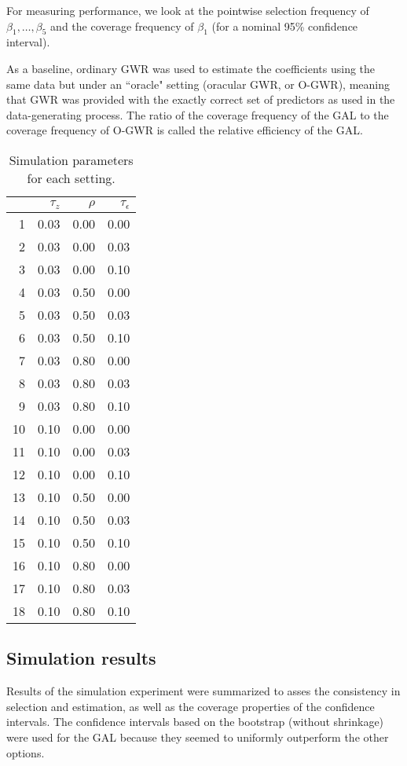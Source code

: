 \documentclass[authoryear, review, 11pt]{elsarticle}
\begin{document}
	For measuring performance, we look at the pointwise selection frequency of $\beta_1, \dots, \beta_5$ and the coverage frequency of $\beta_1$ (for a nominal 95\% confidence interval).
	
	As a baseline, ordinary GWR was used to estimate the coefficients using the same data but under an ``oracle" setting (oracular GWR, or O-GWR), meaning that GWR was provided with the exactly correct set of predictors as used in the data-generating process. The ratio of the coverage frequency of the GAL to the coverage frequency of O-GWR is called the relative efficiency of the GAL.\\
	
\begin{table}[h!]
	\begin{center}
	\begin{tabular}{rrrr}
		\hline
		& $\tau_z$ & $\rho$ & $\tau_{\epsilon}$ \\ 
		\hline
		1 & 0.03 & 0.00 & 0.00 \\ 
		2 & 0.03 & 0.00 & 0.03 \\ 
		3 & 0.03 & 0.00 & 0.10 \\ 
		4 & 0.03 & 0.50 & 0.00 \\ 
		5 & 0.03 & 0.50 & 0.03 \\ 
		6 & 0.03 & 0.50 & 0.10 \\ 
		7 & 0.03 & 0.80 & 0.00 \\ 
		8 & 0.03 & 0.80 & 0.03 \\ 
		9 & 0.03 & 0.80 & 0.10 \\ 
		10 & 0.10 & 0.00 & 0.00 \\ 
		11 & 0.10 & 0.00 & 0.03 \\ 
		12 & 0.10 & 0.00 & 0.10 \\ 
		13 & 0.10 & 0.50 & 0.00 \\ 
		14 & 0.10 & 0.50 & 0.03 \\ 
		15 & 0.10 & 0.50 & 0.10 \\ 
		16 & 0.10 & 0.80 & 0.00 \\ 
		17 & 0.10 & 0.80 & 0.03 \\ 
		18 & 0.10 & 0.80 & 0.10
	\end{tabular}
	\end{center}
	\caption{Simulation parameters for each setting.\label{table:simulation_settings}}
\end{table}
	
	\subsection{Simulation results}
	Results of the simulation experiment were summarized to asses the consistency in selection and estimation, as well as the coverage properties of the confidence intervals. The confidence intervals based on the bootstrap (without shrinkage) were used for the GAL because they seemed to uniformly outperform the other options.\\
	
\end{document}
